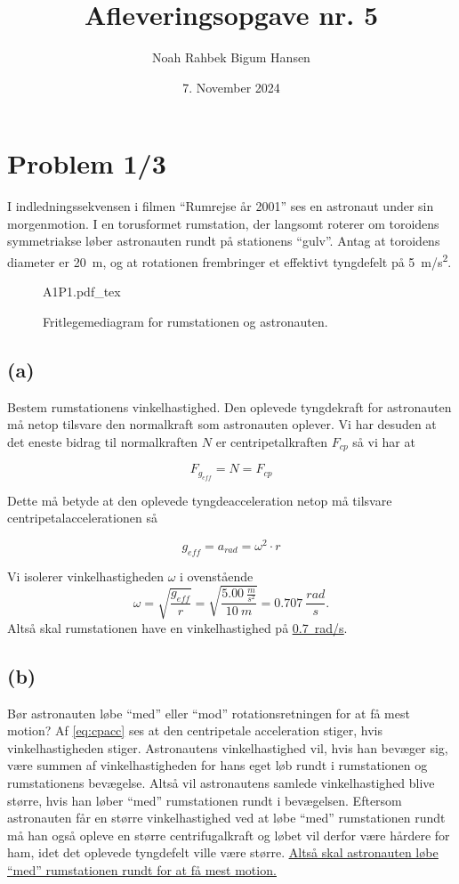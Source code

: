 \documentclass[12pt]{article}
\title{Afleveringsopgave nr. 5}
\author{Noah Rahbek Bigum Hansen}
\date{7. November 2024}
\newcommand{\incfig}[2][1]{%
  \def\svgwidth{#1\columnwidth}
  {#2.pdf_tex}
}
\theoremstyle{definition}
\begin{document}
\maketitle

\section*{Problem 1/3}
I indledningssekvensen i filmen ``Rumrejse år 2001'' ses en astronaut under sin morgenmotion. I en torusformet rumstation, der langsomt roterer om toroidens symmetriakse løber astronauten rundt på stationens ``gulv''. Antag at toroidens diameter er \qty{20}{m}, og at rotationen frembringer et effektivt tyngdefelt på \qty{5}{m/s^2}.

\begin{figure}[ht]
  \centering
  \incfig[0.4]{A1P1}
  \caption{Fritlegemediagram for rumstationen og astronauten.}
  \label{fig:A1P1}
\end{figure}

\subsection*{(a)}
Bestem rumstationens vinkelhastighed.
\bigbreak
Den oplevede tyngdekraft for astronauten må netop tilsvare den normalkraft som astronauten oplever. Vi har desuden at det eneste bidrag til normalkraften $N$ er centripetalkraften $F_{cp}$ så vi har at

\begin{equation} \label{eq:fcp}
  F_{g_{eff}} = N = F_{cp}
\end{equation}

Dette må betyde at den oplevede tyngdeacceleration netop må tilsvare centripetalaccelerationen så

\begin{equation} \label{eq:cpacc}
  g_{eff} = a_{rad} = \omega^2\cdot r
\end{equation}

Vi isolerer vinkelhastigheden $\omega$ i ovenstående
\[ 
\omega = \sqrt{\frac{g_{eff}}{r}} = \sqrt{\frac{\qty{5,00}{\frac{m}{s^2}}}{\qty{10}{m}}} = \qty{0,707}{\frac{rad}{s}} 
.\]
Altså skal rumstationen have en vinkelhastighed på  \underline{\underline{\qty{0,7}{rad/s}}}.


\subsection*{(b)}
Bør astronauten løbe ``med'' eller ``mod'' rotationsretningen for at få mest motion?
\bigbreak
Af \autoref{eq:cpacc} ses at den centripetale acceleration stiger, hvis vinkelhastigheden stiger. Astronautens vinkelhastighed vil, hvis han bevæger sig, være summen af vinkelhastigheden for hans eget løb rundt i rumstationen og rumstationens bevægelse. Altså vil astronautens samlede vinkelhastighed blive større, hvis han løber ``med'' rumstationen rundt i bevægelsen. Eftersom astronauten får en større vinkelhastighed ved at løbe ``med'' rumstationen rundt må han også opleve en større centrifugalkraft og løbet vil derfor være hårdere for ham, idet det oplevede tyngdefelt ville være større.
\bigbreak
\underline{\underline{Altså skal astronauten løbe ``med'' rumstationen rundt for at få mest motion.}}
\end{document}
